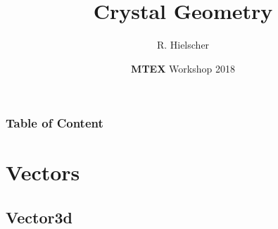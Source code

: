\documentclass[compress]{beamer}
\author{R. Hielscher}
\title{Crystal Geometry}
\institute{Faculty of Mathematics,\\
	Chemnitz University of Technology, Germany}
\date{{\bf{\color{red}M}TEX} Workshop 2018}
\begin{document}
\begin{frame}
  \maketitle{}
\end{frame}

\begin{frame}
  \frametitle{Table of Content}

\tableofcontents{}

\end{frame}


\section{Vectors}

\subsection*{Vector3d}
\end{document}
